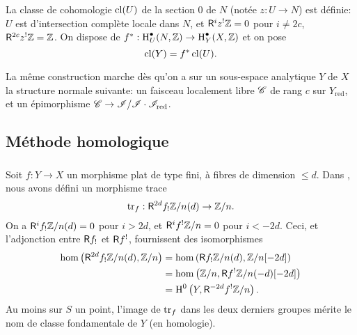 La classe de cohomologie $\operatorname{cl}(U)$ de la section $0$ de $N$ (not\'ee $z:U\to N$) 
est d\'efinie: $U$ est d'intersection compl\`ete locale dans $N$, et 
$\mathsf{R}^i z^!\mathbb{Z} = 0$ pour $i\ne 2 c$, $\mathsf{R}^{2 c} z^!\mathbb{Z} = \mathbb{Z}$. On dispose de 
$f^*:\operatorname{H}_U^\bullet(N,\mathbb{Z}) \to \operatorname{H}_Y^\bullet(X,\mathbb{Z})$ et on pose 
\[
  \operatorname{cl}(Y) = f^*\operatorname{cl}(U) \text{.}
\]

La m\^eme construction marche d\`es qu'on a sur un sous-espace analytique $Y$ 
de $X$ la structure normale suivante: un faisceau localement libre $\mathscr{C}$ de 
rang $c$ sur $Y_\text{red}$, et un \'epimorphisme 
$\mathscr{C}\to \mathscr{I}/\mathscr{I}\cdot \mathscr{I}_\text{red}$. 










\subsection{M\'ethode homologique}\label{IV:2-3}





\subsubsection{}\label{IV:2-3-1}

Soit $f:Y\to X$ un morphisme plat de type fini, \`a fibres de dimension 
$\leqslant d$. Dans \cite[XVIII 2.9]{sga4}, nous avons d\'efini un morphisme 
trace 
\begin{equation}\label{IV:eq:2-3-1-1}
  \operatorname{tr}_f:\mathsf{R}^{2 d} f_! \mathbb{Z}/n(d) \to \mathbb{Z}/n \text{.}
\end{equation}
On a $\mathsf{R}^i f_!\mathbb{Z}/n(d)=0$ pour $i>2 d$, et $\mathsf{R}^i f^!\mathbb{Z}/n=0$ pour $i<-2 d$. 
Ceci, et l'adjonction entre $\mathsf{R} f_!$ et $\mathsf{R} f^!$, fournissent des isomorphismes 
\begin{equation}\label{IV:eq:2-1-3-2}
\begin{aligned}
  \hom\left(\mathsf{R}^{2 d}f_!\mathbb{Z}/n(d),\mathbb{Z}/n\right) 
    &= \hom\left(\mathsf{R} f_!\mathbb{Z}/n(d),\mathbb{Z}/n[-2 d]\right) \\
    &= \hom\left(\mathbb{Z}/n,\mathsf{R} f^!\mathbb{Z}/n(-d)[-2 d]\right) \\
    &= \operatorname{H}^0\left(Y,\mathsf{R}^{-2 d}f^!\mathbb{Z}/n\right) \text{.}
\end{aligned}
\end{equation}
Au moins sur $S$ un point, l'image de $\operatorname{tr}_f$ dans les deux derniers groupes 
m\'erite le nom de classe fondamentale de $Y$ (en homologie). 

